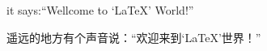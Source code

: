 \documentclass{article}
\begin{document}
it says:\enquote{Wellcome to \enquote{\LaTeX{}} World!}

遥远的地方有个声音说：\enquote{欢迎来到\enquote{\LaTeX{}}世界！}
\end{document}
